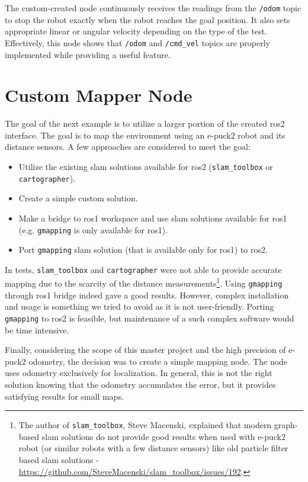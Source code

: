 The custom-created node continuously receives the readings from the \texttt{/odom} topic to stop the robot exactly when the robot reaches the goal position.
It also sets appropriate linear or angular velocity depending on the type of the test.
Effectively, this node shows that \texttt{/odom} and \texttt{/cmd\_vel} topics are properly implemented while providing a useful feature.

\section{Custom Mapper Node}
\label{sec:demos:mapping}

The goal of the next example is to utilize a larger portion of the created \ac{ros2} interface.
The goal is to map the environment using an e-puck2 robot and its distance sensors.
A few approaches are considered to meet the goal:
\begin{itemize}
    \item Utilize the existing \ac{slam} solutions available for \ac{ros2} (\texttt{slam\_toolbox} or \texttt{cartographer}).
    \item Create a simple custom solution.
    \item Make a bridge to \ac{ros}1 workspace and use \ac{slam} solutions available for \ac{ros}1 (e.g. \texttt{gmapping} is only available for \ac{ros}1).
    \item Port \texttt{gmapping} \ac{slam} solution (that is available only for \ac{ros}1) to \ac{ros2}.
\end{itemize}

In tests, \texttt{slam\_toolbox} and \texttt{cartographer} were not able to provide accurate mapping due to the scarcity of the distance measurements\footnote{The author of \texttt{slam\_toolbox}, Steve Macenski, explained that modern graph-based \ac{slam} solutions do not provide good results when used with e-puck2 robot (or similar robots with a few distance sensors) like old particle filter based \ac{slam} solutions - \url{https://github.com/SteveMacenski/slam_toolbox/issues/192}.}. Using \texttt{gmapping} through \ac{ros}1 bridge indeed gave a good results.
However, complex installation and usage is something we tried to avoid as it is not user-friendly.
Porting \texttt{gmapping} to \ac{ros2} is feasible, but maintenance of a such complex software would be time intensive.

Finally, considering the scope of this master project and the high precision of e-puck2 odometry, the decision was to create a simple mapping node.
The node uses odometry exclusively for localization.
In general, this is not the right solution knowing that the odometry accumulates the error, but it provides satisfying results for small maps. 

